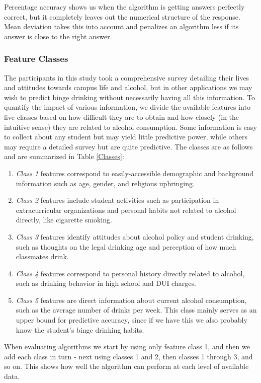 Percentage accuracy shows us when the algorithm is getting answers perfectly correct, but it completely leaves out the numerical structure of the response.  Mean deviation takes this into account and penalizes an algorithm less if its answer is close to the right answer.

\subsubsection{Feature Classes}

The participants in this study took a comprehensive survey detailing their lives and attitudes towards campus life and alcohol, but in other applications we may wish to predict binge drinking without necessarily having all this information.  To quantify the impact of various information, we divide the available features into five classes based on how difficult they are to obtain and how closely (in the intuitive sense) they are related to alcohol consumption.  Some information is easy to collect about any student but may yield little predictive power, while others may require a detailed survey but are quite predictive.  The classes are as follows and are summarized in Table \ref{Classes}:

\begin{enumerate}
\item \emph{Class 1} features correspond to easily-accessible demographic and background information such as age, gender, and religious upbringing.
\item \emph{Class 2} features include student activities such as participation in extracurricular organizations and personal habits not related to alcohol directly, like cigarette smoking.
\item \emph{Class 3} features identify attitudes about alcohol policy and student drinking, such as thoughts on the legal drinking age and perception of how much classmates drink.
\item \emph{Class 4} features correspond to personal history directly related to alcohol, such as drinking behavior in high school and DUI charges.
\item \emph{Class 5} features are direct information about current alcohol consumption, such as the average number of drinks per week.  This class mainly serves as an upper bound for predictive accuracy, since if we have this we also probably know the student's binge drinking habits.
\end{enumerate}

When evaluating algorithms we start by using only feature class 1, and then we add each class in turn - next using classes 1 and 2, then classes 1 through 3, and so on.  This shows how well the algorithm can perform at each level of available data.
